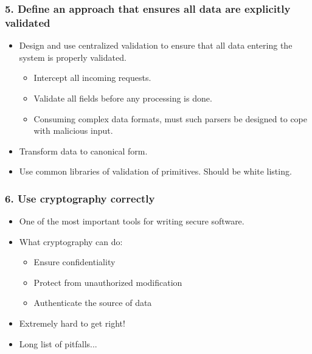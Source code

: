 \documentclass[12pt,norsk]{beamer}
\begin{document}
\begin{frame}

	\frametitle{5. Define an approach that ensures all data are explicitly validated}
	
	\begin{itemize}
		\item Design and use centralized validation to ensure that all data entering the system is properly validated. 
		\begin{itemize}
			\item Intercept all incoming requests.
			\item Validate all fields before any processing is done.
			\item Consuming complex data formats, must such parsers be designed to cope with malicious input.

		\end{itemize}

		\item Transform data to canonical form.
		\item Use common libraries of validation of primitives. Should be white listing. 			
	
	\end{itemize}
	

\end{frame}

\begin{frame}

	\frametitle{6. Use cryptography correctly}

	\begin{itemize}
		
		\item One of the most important tools for writing secure software.
		\item What cryptography can do:
	
		\begin{itemize}
	
			\item Ensure confidentiality	
			\item Protect from unauthorized modification
			\item Authenticate the source of data
		\end{itemize}	 
	
		\item Extremely hard to get right!
		\item Long list of pitfalls...	
	
	\end{itemize}

\end{frame}
\end{document}
